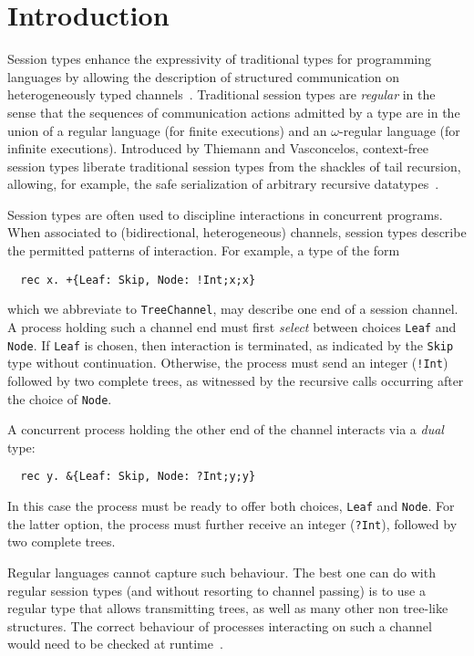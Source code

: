 \section{Introduction}
\label{sec:introduction}

Session types enhance the expressivity of traditional types for
programming languages by allowing the description of structured
communication on heterogeneously typed
channels~\cite{DBLP:conf/concur/Honda93,DBLP:conf/esop/HondaVK98,DBLP:conf/parle/TakeuchiHK94}.
%
Traditional session types are \emph{regular} in the sense that the
sequences of communication actions admitted by a type are in the union
of a regular language (for finite executions) and an $\omega$-regular
language (for infinite executions).
%
Introduced by Thiemann and Vasconcelos, context-free session types
liberate traditional session types from the shackles of tail
recursion, allowing, for example, the safe serialization of arbitrary
recursive datatypes~\cite{thiemann2016context}.

Session types are often used to discipline interactions in concurrent
programs. When associated to (bidirectional, heterogeneous) channels,
session types describe the permitted patterns of interaction. For
example, a type of the form
%
\begin{lstlisting}
  rec x. +{Leaf: Skip, Node: !Int;x;x}
\end{lstlisting}
%
which we abbreviate to \lstinline|TreeChannel|, may describe one end
of a session channel. A process holding such a channel end must first
\emph{select} between choices \lstinline|Leaf| and
\lstinline|Node|. If \lstinline|Leaf| is chosen, then interaction is
terminated, as indicated by the \lstinline|Skip| type without
continuation. Otherwise, the process must send an integer
(\lstinline|!Int|) followed by two complete trees, as witnessed by the
recursive calls occurring after the choice of \lstinline|Node|.

A concurrent process holding the other end of the channel 
interacts via a \emph{dual} type:
%
\begin{lstlisting}
  rec y. &{Leaf: Skip, Node: ?Int;y;y}
\end{lstlisting}
%
In this case the process must be ready to offer both choices,
\lstinline|Leaf| and \lstinline|Node|. For the latter option, the
process must further receive an integer (\lstinline|?Int|), followed
by two complete trees.

Regular languages cannot capture such behaviour. The best one can do
with regular session types (and without resorting to channel passing)
is to use a regular type that allows transmitting trees, as well as
many other non tree-like structures. The correct behaviour of
processes interacting on such a channel would need to be checked at
runtime~\cite{almeida.etal_freest-functional-language,thiemann2016context}.

